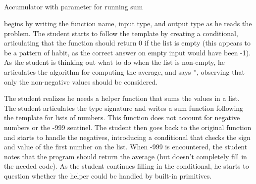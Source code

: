 


\subsection{\ssix}
{Accumulator with parameter for running sum}

\ssix begins by writing the function name, input type, and output type
as he reads the problem. The student starts to
follow the template by creating a conditional, articulating that the
function should return 0 if the list is empty (this appears to be a
pattern of habit, as the correct answer on empty input would have been
-1).  As the student is thinking out what to do when the list is
non-empty, he articulates the algorithm for computing the average,
and says '', observing that only the non-negative values should be
considered.

The student realizes he needs a helper function that sums the
values in a list.  The student articulates the type signature and
writes a sum function following the \htdp template for lists of
numbers.  This function does not account for negative numbers or the
-999 sentinel. The student then goes back to the original function and
starts to handle the negatives, introducing a conditional that checks
the sign and value of the first number on the list. When -999 is
encountered, the student notes that the program should return the
average (but doesn't completely fill in the needed code). As the
student continues filling in the conditional, he starts to question
whether the helper could be handled by built-in primitives.


